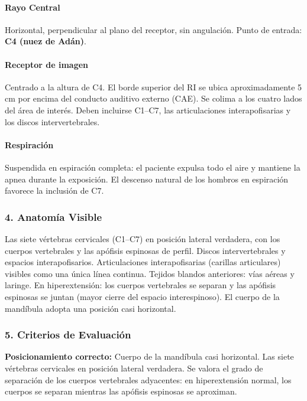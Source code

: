 	\paragraph{Rayo Central}
	Horizontal, perpendicular al plano del receptor, sin angulación. Punto de entrada: \textbf{C4 (nuez de Adán)}.
	
	\paragraph{Receptor de imagen}
	Centrado a la altura de C4. El borde superior del RI se ubica aproximadamente 5 cm por encima del conducto auditivo externo (CAE). Se colima a los cuatro lados del área de interés. Deben incluirse C1--C7, las articulaciones interapofisarias y los discos intervertebrales.
	
	\paragraph{Respiración}
	Suspendida en espiración completa: el paciente expulsa todo el aire y mantiene la apnea durante la exposición. El descenso natural de los hombros en espiración favorece la inclusión de C7.
	
	\subsubsection*{4. Anatomía Visible}
	
	Las siete vértebras cervicales (C1--C7) en posición lateral verdadera, con los cuerpos vertebrales y las apófisis espinosas de perfil. Discos intervertebrales y espacios interapofisarios. Articulaciones interapofisarias (carillas articulares) visibles como una única línea continua. Tejidos blandos anteriores: vías aéreas y laringe. En hiperextensión: los cuerpos vertebrales se separan y las apófisis espinosas se juntan (mayor cierre del espacio interespinoso). El cuerpo de la mandíbula adopta una posición casi horizontal.
	
	\subsubsection*{5. Criterios de Evaluación}
	
	\textbf{Posicionamiento correcto:} Cuerpo de la mandíbula casi horizontal. Las siete vértebras cervicales en posición lateral verdadera. Se valora el grado de separación de los cuerpos vertebrales adyacentes: en hiperextensión normal, los cuerpos se separan mientras las apófisis espinosas se aproximan.
	
